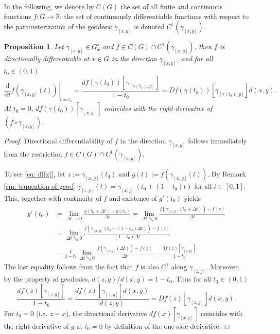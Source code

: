 \documentclass{article}
\theoremstyle{plain}\newtheorem{theorem}{Theorem}[section]
\theoremstyle{plain}\newtheorem{definition}[theorem]{Definition}
\theoremstyle{plain}\newtheorem{lemma}[theorem]{Lemma}
\theoremstyle{definition}\newtheorem{remark}[theorem]{Remark}
\theoremstyle{definition}\newtheorem{example}[theorem]{Example}
\theoremstyle{plain}\newtheorem{proposition}[theorem]{Proposition}
\theoremstyle{plain}\newtheorem{inference}[theorem]{Inference}
\theoremstyle{plain}\newtheorem{corollary}[theorem]{Corollary}
\theoremstyle{plain}\newtheorem{assumption}[theorem]{Assumption}
\renewcommand{\equiv}{:=}
\begin{document}
In the following, we denote by $C(G)$ the set of all finite and continuous functions $f:G\to\mathbb{R}$; the set of continuously differentiable functions with respect to the parameterization of the geodesic $\gamma_{[x,y]}$ is denoted $C^1(\gamma_{[x,y]})$.
\begin{proposition}\label{pr: C^1 implies diff}
    Let $\gamma_{[x,y]}\in G_x^{\circ}$ and $f\in C(G)\cap C^1(\gamma_{[x,y]})$, then $f$ is directionally differentiable at $x\in G$ in the direction $\gamma_{[x,y]}$, and for all $t_0\in(0,1)$
    \begin{equation}\label{eq: df(z)}
        \left.\frac{\mathrm{d}}{\mathrm{d}t}f(\gamma_{[x,y]}(t))\right|_{t=t_0}=\frac{df(\gamma(t_0))[\gamma_{[\gamma(t_0),y]}]}{1-t_0}=Df(\gamma(t_0))[\gamma_{[\gamma(t_0),y]}]d(x,y).
    \end{equation}
    At $t_0=0$, $df(\gamma(t_0))[\gamma_{[x,y]}]$ coincides with the right-derivative of $(f\circ\gamma_{[x,y]})$.
\end{proposition}
\begin{proof}
    Directional differentiability of $f$ in the direction $\gamma_{[x,y]}$ follows immediately from the restriction $f\in C(G)\cap C^1(\gamma_{[x,y]})$.

    To see \eqref{eq: df(z)}, let $z:=\gamma_{[x,y]}(t_0)$ and $g(t)\equiv f(\gamma_{[x,y]}(t))$. By Remark \ref{rm: truncation of geod} $\gamma_{[z,y]}(t)=\gamma_{[x,y]}(t_0+(1-t_0)t)$ for all $t\in[0,1]$. This, together with continuity of $f$ and existence of $g'(t_0)$ yields
    \begin{align*}
        g'(t_0)&=\lim_{\Delta t\to 0}\frac{g(t_0+\Delta t)-g(t_0)}{\Delta t}=\lim_{\Delta t\searrow 0}\frac{f(\gamma_{[x,y]}(t_0+\Delta t))-f(z)}{\Delta t}\\
        &=\lim_{\Delta t\searrow 0}\frac{f(\gamma_{[x,y]}(t_0+(1-t_0)\Delta t))-f(z)}{(1-t_0)\Delta t}\\
        &=\frac{1}{1-t_0}\lim_{\Delta t\searrow 0}\frac{f(\gamma_{[z,y]}(\Delta t))-f(z)}{\Delta t}=\frac{df(z)[\gamma_{[z,y]}]}{1-t_0}.
    \end{align*}
    The last equality follows from the fact that $f$ is also $C^1$ along $\gamma_{[z,y]}$. Moreover, by the property of geodesics, $d(z,y)/d(x,y)=1-t_0$. Thus for all $t_0\in(0,1)$
    $$
    \frac{df(z)[\gamma_{[z,y]}]}{1-t_0}=\frac{df(z)[\gamma_{[z,y]}]d(x,y)}{d(z,y)}=Df(z)[\gamma_{[z,y]}]d(x,y).
    $$
    For $t_0=0$ (i.e. $z=x$), the directional derivative $df(x)[\gamma_{[x,y]}]$ coincides with the right-derivative of $g$ at $t_0=0$ by definition of the one-side derivative.
\end{proof}
\end{document}
